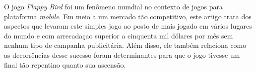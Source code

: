 O jogo \textit{Flappy Bird} foi um fenômeno mundial no contexto de jogos para plataforma \textit{mobile}. Em meio a um mercado tão competitivo, este artigo trata dos aspectos que levaram este simples jogo ao posto de mais jogado em vários lugares do mundo e com arrecadaçao superior a cinquenta mil dólares por mês sem nenhum tipo de campanha publicitária. Além disso, ele também relaciona como as decorrências desse sucesso foram determinantes para que o jogo tivesse um final tão repentino quanto sua ascensão.